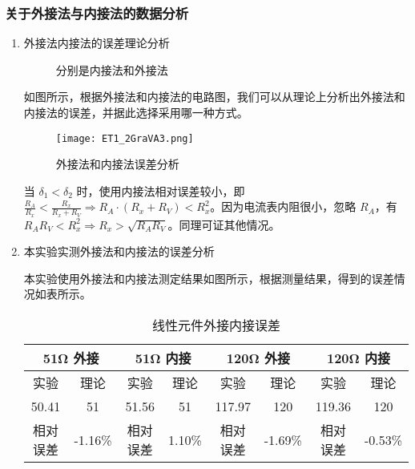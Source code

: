 \documentclass[dvipsnames, svgnames,a4paper,11pt]{article}
\begin{document}
	\subsubsection{关于外接法与内接法的数据分析}
	\begin{enumerate}
		\item 外接法内接法的误差理论分析
		
		\begin{figure}[htbp]
			\centering
			\caption{分别是内接法和外接法}
			\label{fig:figVA1}			
		\end{figure}
		
		如图所示，根据外接法和内接法的电路图，我们可以从理论上分析出外接法和内接法的误差，并据此选择采用哪一种方式。
		
		\begin{figure}[htbp]
			\centering
			\texttt{[image: ET1\_2GraVA3.png]}
			\caption{外接法和内接法误差分析}
			\label{fig:figVA}
		\end{figure}

		当 $\delta_1 < \delta_2$ 时，使用内接法相对误差较小，即 $\frac{R_A}{R_x} < \frac{R_x}{R_x + R_{V}} \Rightarrow R_A \cdot (R_x + R_{V}) < R^2_x$。因为电流表内阻很小，忽略 $R_A$，有 $R_A R_V < R^2_x \Rightarrow R_x > \sqrt{R_A R_{V}}$。同理可证其他情况。

		
		\item 本实验实测外接法和内接法的误差分析
		
		本实验使用外接法和内接法测定结果如图所示，根据测量结果，得到的误差情况如表所示。
		
		\begin{table}[h]
			\centering
			\caption{线性元件外接内接误差}
			\label{tab:tab6}
			\begin{tabular}{|c|c|c|c|c|c|c|c|}
				\hline
				\multicolumn{2}{|c|}{51Ω 外接} & \multicolumn{2}{c|}{51Ω 内接} & \multicolumn{2}{c|}{120Ω 外接} & \multicolumn{2}{c|}{120Ω 内接} \\
				\hline
				实验 & 理论 & 实验 & 理论 & 实验 & 理论 & 实验 & 理论 \\
				\hline
				50.41 & 51 & 51.56 & 51 & 117.97 & 120 & 119.36 & 120 \\
				\hline
				相对误差 & -1.16\% & 相对误差 & 1.10\% & 相对误差 & -1.69\% & 相对误差 & -0.53\% \\
				\hline
			\end{tabular}
		\end{table}
		

\end{enumerate}
\end{document}
